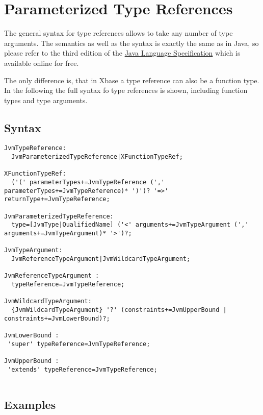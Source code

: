 \documentclass[a4paper,10pt]{scrreprt}
\begin{document}
\section{Parameterized Type References}
\label{ParameterizedTypeReference}
The general syntax for type references allows to take any number of type arguments. The semantics as well as the syntax is exactly the same as in Java, so please 
refer to the third edition of the  \href{http://java.sun.com/docs/books/jls/third_edition/html/j3TOC.html}{Java Language Specification} which is available online for free.

The only difference is, that in Xbase a type reference can also be a function type. In the following the full syntax fo type references is shown, including function types and
type arguments.

\subsection{Syntax}

\begin{lstlisting}
JvmTypeReference:
  JvmParameterizedTypeReference|XFunctionTypeRef;
	
XFunctionTypeRef:
  ('(' parameterTypes+=JvmTypeReference (',' parameterTypes+=JvmTypeReference)* ')')? '=>' returnType+=JvmTypeReference;

JvmParameterizedTypeReference:
  type=[JvmType|QualifiedName] ('<' arguments+=JvmTypeArgument (',' arguments+=JvmTypeArgument)* '>')?;

JvmTypeArgument:
  JvmReferenceTypeArgument|JvmWildcardTypeArgument;
  
JvmReferenceTypeArgument :
  typeReference=JvmTypeReference;

JvmWildcardTypeArgument:
  {JvmWildcardTypeArgument} '?' (constraints+=JvmUpperBound | constraints+=JvmLowerBound)?;

JvmLowerBound :
 'super' typeReference=JvmTypeReference;

JvmUpperBound : 
 'extends' typeReference=JvmTypeReference;


\end{lstlisting}





\subsection{Examples}
\end{document}

